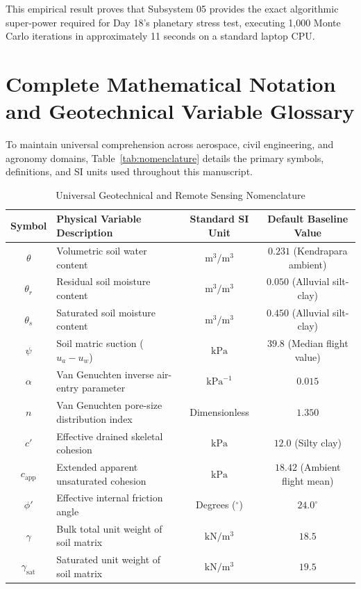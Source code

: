 \documentclass[11pt,a4paper]{article}
\theoremstyle{definition}
\theoremstyle{remark}
\begin{document}
This empirical result proves that Subsystem 05 provides the exact algorithmic super-power required for Day 18's planetary stress test, executing 1,000 Monte Carlo iterations in approximately 11 seconds on a standard laptop CPU.

\section{Complete Mathematical Notation and Geotechnical Variable Glossary}

To maintain universal comprehension across aerospace, civil engineering, and agronomy domains, Table~\ref{tab:nomenclature} details the primary symbols, definitions, and SI units used throughout this manuscript.

\begin{table}[htbp]
\centering
\small
\caption{Universal Geotechnical and Remote Sensing Nomenclature}
\begin{tabular}{clcc}
\toprule
\textbf{Symbol} & \textbf{Physical Variable Description} & \textbf{Standard SI Unit} & \textbf{Default Baseline Value} \\
\midrule
$\theta$ & Volumetric soil water content & $\text{m}^3/\text{m}^3$ & $0.231$ (Kendrapara ambient) \\
$\theta_r$ & Residual soil moisture content & $\text{m}^3/\text{m}^3$ & $0.050$ (Alluvial silt-clay) \\
$\theta_s$ & Saturated soil moisture content & $\text{m}^3/\text{m}^3$ & $0.450$ (Alluvial silt-clay) \\
$\psi$ & Soil matric suction ($u_a - u_w$) & $\text{kPa}$ & $39.8$ (Median flight value) \\
$\alpha$ & Van Genuchten inverse air-entry parameter & $\text{kPa}^{-1}$ & $0.015$ \\
$n$ & Van Genuchten pore-size distribution index & Dimensionless & $1.350$ \\
$c'$ & Effective drained skeletal cohesion & $\text{kPa}$ & $12.0$ (Silty clay) \\
$c_{\text{app}}$ & Extended apparent unsaturated cohesion & $\text{kPa}$ & $18.42$ (Ambient flight mean) \\
$\phi'$ & Effective internal friction angle & Degrees ($^\circ$) & $24.0^\circ$ \\
$\gamma$ & Bulk total unit weight of soil matrix & $\text{kN}/\text{m}^3$ & $18.5$ \\
$\gamma_{\text{sat}}$ & Saturated unit weight of soil matrix & $\text{kN}/\text{m}^3$ & $19.5$ \\

\end{tabular}
\end{table}
\end{document}
